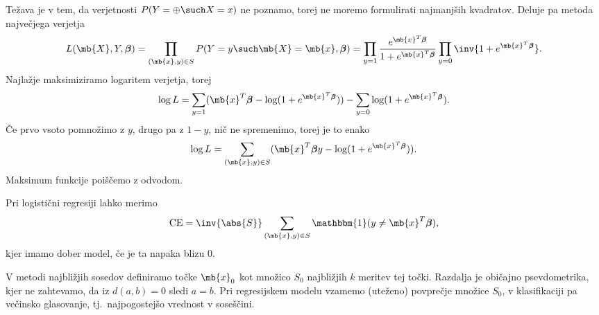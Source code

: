 Težava je v tem, da verjetnosti $P(Y = \oplus \such X = x)$ ne poznamo, torej ne
moremo formulirati najmanjših kvadratov.
Deluje pa metoda največjega verjetja
\[
  L(\mb{X}, Y, \boldsymbol{\beta})
  = \prod_{(\mb{x}, y) \in S} P(Y = y \such \mb{X} = \mb{x}, \boldsymbol{\beta})
  = \prod_{y = 1} \frac{e^{\mb{x}^T \boldsymbol{\beta}}}{1 + e^{\mb{x}^T
	  \boldsymbol{\beta}}}
  \prod_{y = 0} \inv{1 + e^{\mb{x}^T \boldsymbol{\beta}}}.
\]
Najlažje maksimiziramo logaritem verjetja, torej
\[
  \log L
  = \sum_{y = 1} (\mb{x}^T \boldsymbol{\beta} - \log (1 + e^{\mb{x}^T
	\boldsymbol{\beta}}))
  - \sum_{y = 0} \log (1 + e^{\mb{x}^T \boldsymbol{\beta}}).
\]
Če prvo vsoto pomnožimo z $y$, drugo pa z $1 - y$, nič ne spremenimo, torej je
to enako
\[
  \log L = \sum_{(\mb{x}, y) \in S} (\mb{x}^T \boldsymbol{\beta} y - \log(1 +
  e^{\mb{x}^T \boldsymbol{\beta}})).
\]
Maksimum funkcije poiščemo z odvodom.


Pri logistični regresiji lahko merimo 
\[
  \text{CE} = \inv{\abs{S}} \sum_{(\mb{x}, y) \in S} \mathbbm{1}(y \ne \mb{x}^T
  \boldsymbol{\beta}),
\]
kjer imamo dober model, če je ta napaka blizu $0$.



V metodi najbližjih sosedov definiramo  točke $\mb{x}_0$ kot
množico $S_0$ najbližjih $k$ meritev tej točki.
Razdalja je običajno psevdometrika, kjer ne zahtevamo, da iz $d(a, b) = 0$ sledi
$a = b$.
Pri regresijskem modelu vzamemo (uteženo) povprečje množice $S_0$, v
klasifikaciji pa večinsko glasovanje, tj.~najpogostejšo vrednost v soseščini.



